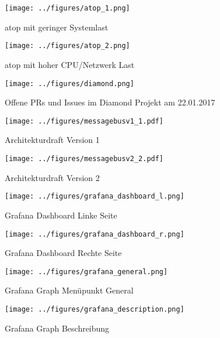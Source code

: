 \begin{figure}[tbph]
  \centering
  \texttt{[image: ../figures/atop\_1.png]}
  \caption{atop mit geringer Systemlast}
\label{figure:atop1}
\end{figure}

\begin{figure}[tbp]
  \centering
  \texttt{[image: ../figures/atop\_2.png]}
  \caption{atop mit hoher CPU/Netzwerk Last}
\label{figure:atop2}
\end{figure}

\begin{figure}[tbp]
  \centering
  \texttt{[image: ../figures/diamond.png]}
  \caption{Offene PRs und Issues im Diamond Projekt am 22.01.2017}
\label{figure:diamond}
\end{figure}

\begin{figure}[tbp]
  \centering
  \texttt{[image: ../figures/messagebusv1\_1.pdf]}
  \caption{Architekturdraft Version 1}
\label{figure:draft1}
\end{figure}
\begin{figure}[tbp]
  \centering
  \texttt{[image: ../figures/messagebusv2\_2.pdf]}
  \caption{Architekturdraft Version 2}
\label{figure:draft2}
\end{figure}
\FloatBarrier{}

\begin{figure}[tbp]
  \centering
  \texttt{[image: ../figures/grafana\_dashboard\_l.png]}
  \caption{Grafana Dashboard Linke Seite}
\label{figure:grafana_dashboard_l}
\end{figure}

\begin{figure}[tbp]
  \centering
  \texttt{[image: ../figures/grafana\_dashboard\_r.png]}
  \caption{Grafana Dashboard Rechte Seite}
\label{figure:grafana_dashboard_r}
\end{figure}

\begin{figure}[tbp]
  \centering
  \texttt{[image: ../figures/grafana\_general.png]}
  \caption{Grafana Graph Menüpunkt General}
\label{figure:grafana_general}
\end{figure}

\begin{figure}[tbp]
  \centering
  \texttt{[image: ../figures/grafana\_description.png]}
  \caption{Grafana Graph Beschreibung}
\label{figure:grafana_description}
\end{figure}

